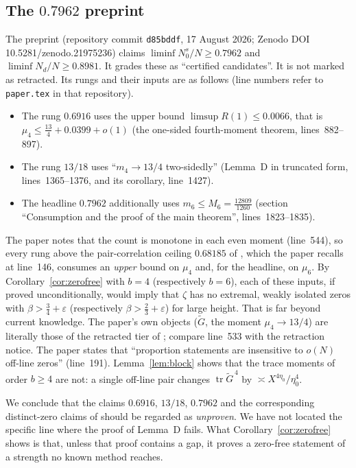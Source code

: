 \documentclass[reqno,11pt]{amsart}
\numberwithin{equation}{section}
\theoremstyle{plain}
\theoremstyle{remark}
\newcommand{\eps}{\varepsilon}
\DeclareMathOperator{\tr}{tr}
\begin{document}
\subsection{\texorpdfstring{The $0.7962$ preprint}{The 0.7962 preprint}}
The preprint \cite{YY26a} (repository commit \texttt{d85bddf}, 17 August 2026;
Zenodo DOI 10.5281/zenodo.21975236) claims $\liminf N_0^{s}/N\ge0.7962$ and
$\liminf N_d/N\ge0.8981$. It grades these as ``certified candidates''. It is
not marked as retracted. Its rungs and their inputs are as follows (line
numbers refer to \texttt{paper.tex} in that repository).
\begin{itemize}
\item The rung $0.6916$ uses the upper bound $\limsup R(1)\le0.0066$, that is
$\mu_4\le\frac{13}4+0.0399+o(1)$ (the one-sided fourth-moment theorem,
lines~882--897).
\item The rung $13/18$ uses ``$m_4\to13/4$ two-sidedly'' (Lemma~D in truncated
form, lines~1365--1376, and its corollary, line~1427).
\item The headline $0.7962$ additionally uses $m_6\le M_6=\frac{12809}{1260}$
(section ``Consumption and the proof of the main theorem'', lines~1823--1835).
\end{itemize}
The paper notes that the count is monotone in each even moment (line~544), so
every rung above the pair-correlation ceiling $0.68185$ of \cite{C26}, which
the paper recalls at line~146, consumes an \emph{upper} bound on $\mu_4$ and,
for the headline, on $\mu_6$. By Corollary~\ref{cor:zerofree} with $b=4$
(respectively $b=6$), each of these inputs, if proved unconditionally, would
imply that $\zeta$ has no extremal, weakly isolated zeros with $\beta>\frac34+\eps$
(respectively $\beta>\frac23+\eps$) for large height. That is far beyond current
knowledge. The paper's own objects ($\widetilde G$, the moment $\mu_4\to13/4$)
are literally those of the retracted tier of \cite{YY26b}; compare line~533 with
the retraction notice. The paper states that ``proportion statements are
insensitive to $o(N)$ off-line zeros'' (line~191). Lemma~\ref{lem:block} shows
that the trace moments of order $b\ge4$ are not: a single off-line pair changes
$\tr\widetilde G^{\,4}$ by $\asymp X^{4\eta_0}/\eta_0^4$.

We conclude that the claims $0.6916$, $13/18$, $0.7962$ and the corresponding
distinct-zero claims of \cite{YY26a} should be regarded as \emph{unproven}.
We have not located the specific line where the proof of Lemma~D fails. What
Corollary~\ref{cor:zerofree} shows is that, unless that proof contains a gap,
it proves a zero-free statement of a strength no known method reaches.
\end{document}
